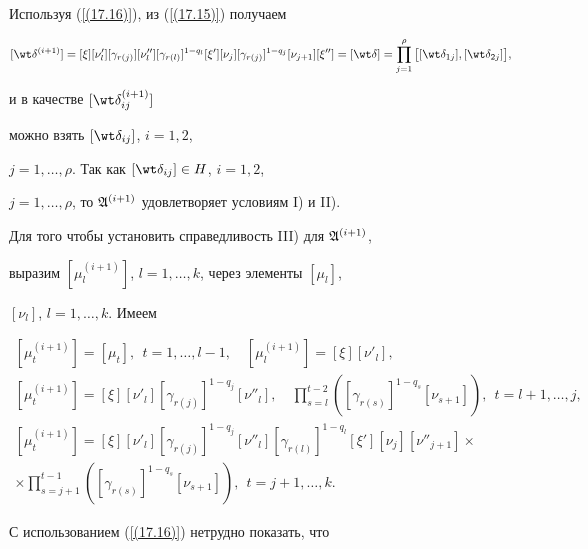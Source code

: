 Используя (\ref{(17.16)}), из (\ref{(17.15)}) получаем


$$


[\wt \delta^{(i+1)}]=[\xi][\nu'_l][\gamma_{r(j)}][\nu''_l]


[\gamma_{r(l)}]^{1-q_l}[\xi'][\nu_j]


[\gamma_{r(j)}]^{1-q_j}[\nu_{j+1}][\xi'']=


[\wt \delta]=\prod_{j=1}^\rho \big[


[\wt \delta_{1j}],[\wt \delta_{2j}]\big],


$$


и в качестве $[\wt \delta^{(i+1)}_{ij}]$


можно взять $[\wt \delta_{ij}]$, $i=1,2$,


$j=1,\dotsc,\rho$. Так как $[\wt \delta_{ij}]\in H$, $i=1,2$,


$j=1,\dotsc,\rho$, то $\frak A^{(i+1)}$ удовлетворяет условиям I) и II).





Для того чтобы установить справедливость III) для $\frak A^{(i+1)}$,


выразим $[\mu^{(i+1)}_l]$, $l=1,\dotsc,k$, через элементы $[\mu_l]$,


$[\nu_l]$, $l=1,\dotsc,k$. Имеем


\begin{gather*}


[\mu^{(i+1)}_t]=[\mu_t],\ \ t=1,\dotsc,l-1,\quad


[\mu^{(i+1)}_l]=[\xi][\nu'_l], \\


[\mu^{(i+1)}_t]=[\xi][\nu'_l][\gamma_{r(j)}]^{1-q_j}


[\nu''_l],\quad \prod^{t-2}_{s=l}([\gamma_{r(s)}]^{1-q_s}[\nu_{s+1}]),


\ \ t=l+1,\dotsc,j,\\


[\mu^{(i+1)}_t]=[\xi][\nu'_l][\gamma_{r(j)}]^{1-q_j}[\nu''_l]


[\gamma_{r(l)}]^{1-q_l}[\xi'][\nu_j][\nu''_{j +1}] \times \\


\times\prod_{s=j+1}^{t- 1}([\gamma_{r(s)}]^{1-q_s}


[\nu_{s+1}]),\ \ t=j+1,\dotsc,k.


\end{gather*}


С использованием (\ref{(17.16)}) нетрудно показать, что


